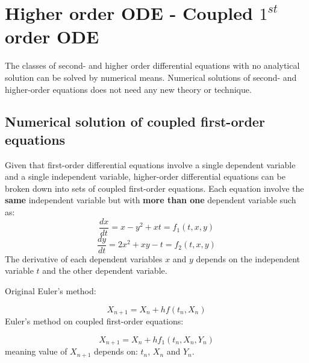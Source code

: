 \documentclass[10pt,a4paper]{article}
\begin{document}
\section{Higher order ODE - Coupled $1^{st}$ order ODE}

The classes of second- and higher order differential equations with no analytical solution can be
solved by numerical means. Numerical solutions of second- and higher-order equations does not need
any new theory or technique.

\subsection{Numerical solution of coupled first-order equations}

Given that first-order differential equations involve a single dependent variable and a single
independent variable, higher-order differential equations can be broken down into sets of coupled
first-order equations. Each equation involve the \textbf{same} independent variable but with
\textbf{more than one} dependent variable such as:
$$
    \frac{dx}{dt}=x-y^2+xt=f_1(t,x,y)
$$
$$
    \frac{dy}{dt}=2x^2+xy-t=f_2(t,x,y)
$$
The derivative of each dependent variables $x$ and $y$ depends on the independent variable $t$ and
the other dependent variable.

\begin{tcolorbox}[breakable,colback=white,colframe=black,width=\dimexpr\textwidth+12mm\relax,enlarge left by=-6mm]
    Original Euler's method: \par 
    $$
        X_{n+1}=X_n+hf(t_n,X_n)
    $$
    Euler's method on coupled first-order equations: \par 
    $$
        X_{n+1}=X_n+hf_1(t_n,X_n,Y_n)
    $$
    meaning value of $X_{n+1}$ depends on: $t_n$, $X_n$ and $Y_n$.
\end{tcolorbox}
\end{document}
